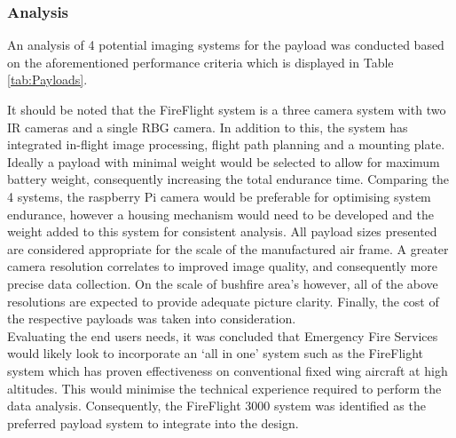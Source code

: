 \subsubsection{Analysis}
An analysis of 4 potential imaging systems for the payload was conducted based on the aforementioned performance criteria which is displayed in Table \ref{tab:Payloads}. 

\begin{table}[H]
\caption{Potential Payload Specification Comparisons}
\label{tab:Payloads}
\end{table}

It should be noted that the FireFlight system is a three camera system with two IR cameras and a single RBG camera. In addition to this, the system has integrated in-flight image processing, flight path planning and a mounting plate. Ideally a payload with minimal weight would be selected to allow for maximum battery weight, consequently increasing the total endurance time. Comparing the 4 systems, the raspberry Pi camera would be preferable for optimising system endurance, however a housing mechanism would need to be developed and the weight added to this system for consistent analysis. All payload sizes presented are considered appropriate for the scale of the manufactured air frame. A greater camera resolution correlates to improved image quality, and consequently more precise data collection. On the scale of bushfire area's however, all of the above resolutions are expected to provide adequate picture clarity. Finally, the cost of the respective payloads was taken into consideration.  \\  

Evaluating the end users needs, it was concluded that Emergency Fire Services would likely look to incorporate an `all in one' system such as the FireFlight system which has proven effectiveness on conventional fixed wing aircraft at high altitudes. This would minimise the technical experience required to perform the data analysis. Consequently, the FireFlight 3000 system was identified as the preferred payload system to integrate into the design.


